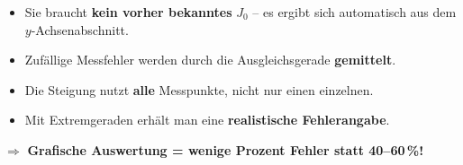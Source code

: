 \documentclass[11pt,a4paper]{scrartcl}
\begin{document}
\begin{hilfebox}[title={\faIcon{lightbulb} Die grafische Methode ist robuster!}]
	\begin{itemize}
		\item Sie braucht \textbf{kein vorher bekanntes} $J_0$ -- es ergibt sich automatisch aus dem $y$-Achsenabschnitt.
		\item Zufällige Messfehler werden durch die Ausgleichsgerade \textbf{gemittelt}.
		\item Die Steigung nutzt \textbf{alle} Messpunkte, nicht nur einen einzelnen.
		\item Mit Extremgeraden erhält man eine \textbf{realistische Fehlerangabe}.
	\end{itemize}
	$\Rightarrow$ \textbf{Grafische Auswertung = wenige Prozent Fehler statt 40--60\,\%!}
\end{hilfebox}
\end{document}

